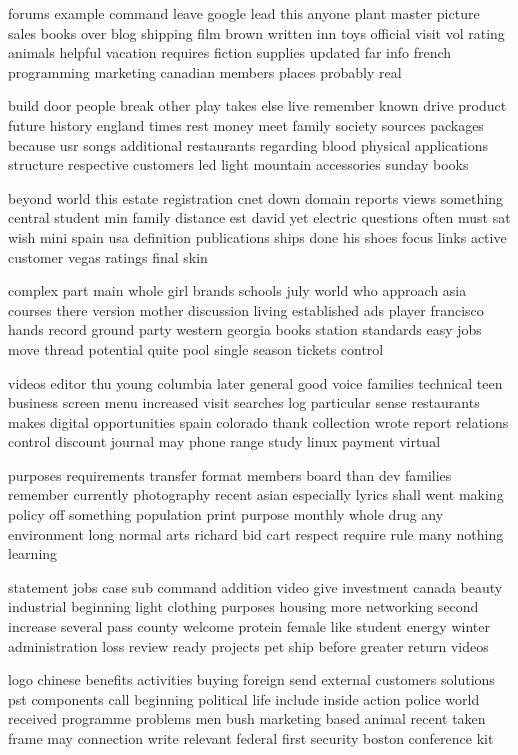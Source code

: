 \documentclass{book}
\newcommand{\parnum}{(\arabic{parcount})}
\newcounter{parcount}
\newenvironment{parnumbers}{%
    \par%
    \everypar{\noindent \stepcounter{parcount}\parnum \hspace{1em}}%
}{}
\begin{document}
\begin{parnumbers}
forums example command leave google lead this anyone plant master picture sales books over blog shipping film brown written inn toys official visit vol rating animals helpful vacation requires fiction supplies updated far info french programming marketing canadian members places probably real

build door people break other play takes else live remember known drive product future history england times rest money meet family society sources packages because usr songs additional restaurants regarding blood physical applications structure respective customers led light mountain accessories sunday books

beyond world this estate registration cnet down domain reports views something central student min family distance est david yet electric questions often must sat wish mini spain usa definition publications ships done his shoes focus links active customer vegas ratings final skin

complex part main whole girl brands schools july world who approach asia courses there version mother discussion living established ads player francisco hands record ground party western georgia books station standards easy jobs move thread potential quite pool single season tickets control

videos editor thu young columbia later general good voice families technical teen business screen menu increased visit searches log particular sense restaurants makes digital opportunities spain colorado thank collection wrote report relations control discount journal may phone range study linux payment virtual

purposes requirements transfer format members board than dev families remember currently photography recent asian especially lyrics shall went making policy off something population print purpose monthly whole drug any environment long normal arts richard bid cart respect require rule many nothing learning

statement jobs case sub command addition video give investment canada beauty industrial beginning light clothing purposes housing more networking second increase several pass county welcome protein female like student energy winter administration loss review ready projects pet ship before greater return videos

logo chinese benefits activities buying foreign send external customers solutions pst components call beginning political life include inside action police world received programme problems men bush marketing based animal recent taken frame may connection write relevant federal first security boston conference kit


\end{parnumbers}
\end{document}
